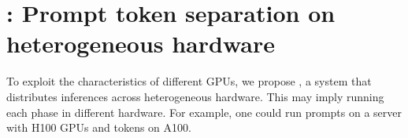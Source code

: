 \section{\papername: Prompt token separation on heterogeneous hardware}

To exploit the characteristics of different GPUs, we propose \papername, a system that distributes inferences across heterogeneous hardware.
This may imply running each phase in different hardware.
For example, one could run prompts on a server with H100 GPUs and tokens on A100.

